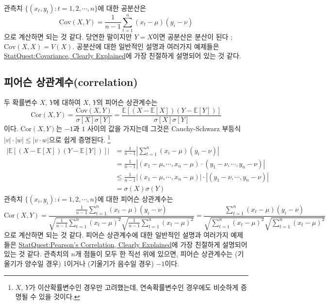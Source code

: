 \documentclass{article}
\begin{document}
관측치 \(\{(x_t, y_t):t=1,2,\cdots,n\}\)에 대한 공분산은
\[\text{Cov}(X,Y)=\frac1{n-1}\sum_{t=1}^n(x_t-\mu)(y_i-\nu)\]
으로 계산하면 되는 것 같다.
당연한 말이지만 \(Y=X\)이면 공분산은 분산이 된다 ; \(\text{Cov}(X,X)=V(X)\).
공분산에 대한 일반적인 설명과 여러가지 예제들은 \href{https://youtu.be/qtaqvPAeEJY}{StatQuest:Covariance, Clearly Explained}에 가장 친절하게 설명되어 있는 것 같다.

\subsection{피어슨 상관계수(correlation)}
두 확률변수 \(X\), \(Y\)에 대하여 \(X\), \(Y\)의 피어슨 상관계수는 
\begin{equation}\label{pearson1}
\text{Cor}(X,Y)=\frac{\text{Cov}(X,Y)}{\sigma[X]\sigma[Y]}=\frac{\mathbb E[(X-\mathbb E[X])(Y-\mathbb E[Y])]}{\sigma[X]\sigma[Y]}
\end{equation}
이다.
\(\text{Cor}(X,Y)\)는 \(-1\)과 \(1\) 사이의 값을 가지는데 그것은 Cauchy-Schwarz 부등식 \(|v|\cdot|w|\le|v\cdot w|\)으로 쉽게 증명된다.
\footnote{\(X\), \(Y\)가 이산확률변수인 경우만 고려했는데, 연속확률변수인 경우에도 비슷하게 증명될 수 있을 것이다.}
\begin{align*}
\bigg|\mathbb E\left[\left(X-\mathbb E[X]\right)\left(Y-\mathbb E[Y]\right)\right]\bigg|
&=\frac1{n-1}\left|\sum_{t=1}^n(x_i-\mu)(y_i-\nu)\right|\\
&=\frac1{n-1}\left|(x_1-\mu,\cdots,x_n-\mu)\cdot(y_1-\nu,\cdots,y_n-\nu)\right|\\
&\le\frac1{n-1}\left|(x_1-\mu,\cdots,x_n-\mu)\right|\cdot\left|(y_1-\nu,\cdots,y_n-\nu)\right|\\
&=\sigma(X)\sigma(Y)
\end{align*}
관측치 \(\{(x_i, y_i):i=1,2,\cdots,n\}\)에 대한 피어슨 상관계수는
\begin{equation}\label{pearson2}
\text{Cor}(X,Y)
=\frac{\frac1{n-1}\sum_{t=1}^n(x_t-\mu)(y_i-\nu)}{\sqrt{\frac1{n-1}\sum_{t=1}^n(x_t-\mu)^2}\sqrt{\frac1{n-1}\sum_{t=1}^n(x_t-\mu)^2}}
=\frac{\sum_{t=1}^n(x_t-\mu)(y_i-\nu)}{\sqrt{\sum_{t=1}^n(x_t-\mu)^2}\sqrt{\sum_{t=1}^n(x_t-\mu)^2}}
\end{equation}
으로 계산하면 되는 것 같다.
피어슨 상관계수에 대한 일반적인 설명과 여러가지 예제들은 \href{https://youtu.be/xZ_z8KWkhXE}{StatQuest:Pearson's Correlation, Clearly Explained}에 가장 친절하게 설명되어 있는 것 같다.
관측치의 \(n\)개 점들이 모두 한 직선 위에 있으면, 피어슨 상관계수는 (기울기가 양수일 경우) 1이거나 (기울기가 음수일 경우) $-1$이다.
\end{document}
